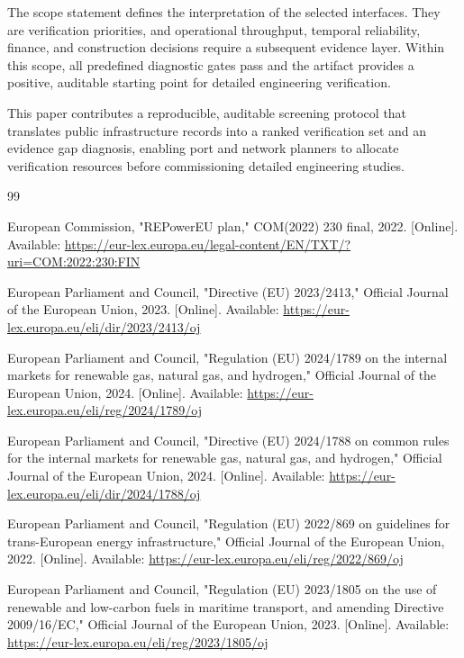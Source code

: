 \documentclass{ieeeaccess}
\begin{document}
The scope statement defines the interpretation of the selected interfaces. They are verification priorities, and operational throughput, temporal reliability, finance, and construction decisions require a subsequent evidence layer. Within this scope, all predefined diagnostic gates pass and the artifact provides a positive, auditable starting point for detailed engineering verification.

This paper contributes a reproducible, auditable screening protocol that translates public infrastructure records into a ranked verification set and an evidence gap diagnosis, enabling port and network planners to allocate verification resources before commissioning detailed engineering studies.


\emergencystretch=0pt
\begin{thebibliography}{99}

European Commission, "REPowerEU plan," COM(2022) 230 final, 2022. [Online]. Available: \url{https://eur-lex.europa.eu/legal-content/EN/TXT/?uri=COM:2022:230:FIN}

European Parliament and Council, "Directive (EU) 2023/2413," Official Journal of the European Union, 2023. [Online]. Available: \url{https://eur-lex.europa.eu/eli/dir/2023/2413/oj}

European Parliament and Council, "Regulation (EU) 2024/1789 on the internal markets for renewable gas, natural gas, and hydrogen," Official Journal of the European Union, 2024. [Online]. Available: \url{https://eur-lex.europa.eu/eli/reg/2024/1789/oj}

European Parliament and Council, "Directive (EU) 2024/1788 on common rules for the internal markets for renewable gas, natural gas, and hydrogen," Official Journal of the European Union, 2024. [Online]. Available: \url{https://eur-lex.europa.eu/eli/dir/2024/1788/oj}

European Parliament and Council, "Regulation (EU) 2022/869 on guidelines for trans-European energy infrastructure," Official Journal of the European Union, 2022. [Online]. Available: \url{https://eur-lex.europa.eu/eli/reg/2022/869/oj}

European Parliament and Council, "Regulation (EU) 2023/1805 on the use of renewable and low-carbon fuels in maritime transport, and amending Directive 2009/16/EC," Official Journal of the European Union, 2023. [Online]. Available: \url{https://eur-lex.europa.eu/eli/reg/2023/1805/oj}


\end{thebibliography}
\end{document}
